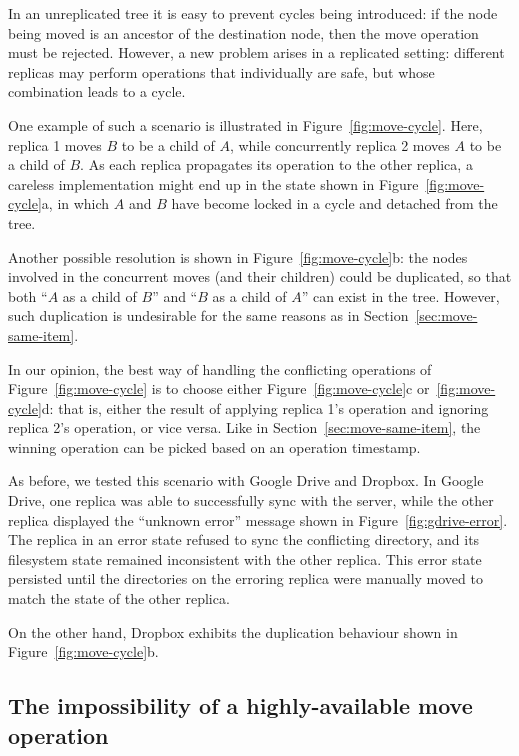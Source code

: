 \documentclass[sigconf]{acmart}
\begin{document}
In an unreplicated tree it is easy to prevent cycles being introduced: if the node being moved is an ancestor of the destination node, then the move operation must be rejected.
However, a new problem arises in a replicated setting: different replicas may perform operations that individually are safe, but whose combination leads to a cycle.

One example of such a scenario is illustrated in Figure~\ref{fig:move-cycle}.
Here, replica 1 moves $B$ to be a child of $A$, while concurrently replica 2 moves $A$ to be a child of $B$.
As each replica propagates its operation to the other replica, a careless implementation might end up in the state shown in Figure~\ref{fig:move-cycle}a, in which $A$ and $B$ have become locked in a cycle and detached from the tree.

Another possible resolution is shown in Figure~\ref{fig:move-cycle}b: the nodes involved in the concurrent moves (and their children) could be duplicated, so that both ``$A$ as a child of $B$'' and ``$B$ as a child of $A$'' can exist in the tree.
However, such duplication is undesirable for the same reasons as in Section~\ref{sec:move-same-item}.

In our opinion, the best way of handling the conflicting operations of Figure~\ref{fig:move-cycle} is to choose either Figure~\ref{fig:move-cycle}c or~\ref{fig:move-cycle}d: that is, either the result of applying replica 1's operation and ignoring replica 2's operation, or vice versa.
Like in Section~\ref{sec:move-same-item}, the winning operation can be picked based on an operation timestamp.

As before, we tested this scenario with Google Drive and Dropbox.
In Google Drive, one replica was able to successfully sync with the server, while the other replica displayed the ``unknown error'' message shown in Figure~\ref{fig:gdrive-error}.
The replica in an error state refused to sync the conflicting directory, and its filesystem state remained inconsistent with the other replica.
This error state persisted until the directories on the erroring replica were manually moved to match the state of the other replica.

On the other hand, Dropbox exhibits the duplication behaviour shown in Figure~\ref{fig:move-cycle}b.

\subsection{The impossibility of a highly-available move operation}\label{sec:impossibility}
\end{document}
